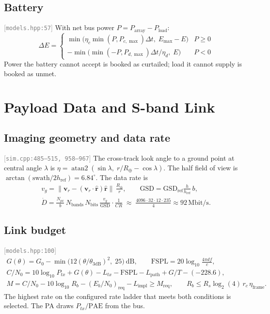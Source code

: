 \documentclass[11pt,a4paper]{article}
\newcommand{\vb}[1]{\boldsymbol{#1}}
\newcommand{\uv}[1]{\hat{\boldsymbol{#1}}}
\newcommand{\src}[1]{\textcolor{gray}{\small[\texttt{#1}]}}
\begin{document}
\subsection{Battery} \src{models.hpp:57}
With net bus power $P = P_{\text{array}} - P_{\text{load}}$:
\begin{equation}
\Delta E = \begin{cases}
\min\!\big(\eta_c\min(P, P_{c,\max})\Delta t,\; E_{\max} - E\big) & P \ge 0\\
-\min\!\big(\min(-P, P_{d,\max})\Delta t/\eta_d,\; E\big) & P < 0
\end{cases}
\end{equation}
Power the battery cannot accept is booked as curtailed; load it cannot supply is booked as unmet.

\section{Payload Data and S-band Link}

\subsection{Imaging geometry and data rate} \src{sim.cpp:485--515, 958--967}
The cross-track look angle to a ground point at central angle $\lambda$ is $\eta = \operatorname{atan2}(\sin\lambda,\; r/R_\oplus - \cos\lambda)$. The half field of view is $\arctan(\text{swath}/2h_{\text{ref}}) = 6.84^\circ$. The data rate is
\begin{gather}
v_g = \big\lVert\vb v_r - (\vb v_r\cdot\uv r)\uv r\big\rVert\,\frac{R_\oplus}{r},\qquad
\text{GSD} = \text{GSD}_{\text{ref}}\frac{h}{h_{\text{ref}}}\,b,\\
\dot D = \frac{N_{px}}{b}\,N_{\text{bands}}\,N_{\text{bits}}\,\frac{v_g}{\text{GSD}}\cdot\frac{1}{CR}\;\approx\;\frac{4096\cdot32\cdot12\cdot235}{4} \approx 92\,\mathrm{Mbit/s}.
\end{gather}

\subsection{Link budget} \src{models.hpp:100}
\begin{gather}
G(\theta) = G_0 - \min\!\big(12(\theta/\theta_{3\text{dB}})^2,\; 25\big)\ \mathrm{dB},\qquad
\text{FSPL} = 20\log_{10}\frac{4\pi d f}{c},\\
C/N_0 = 10\log_{10}P_{tx} + G(\theta) - L_{tx} - \text{FSPL} - L_{\text{path}} + G/T - (-228.6),\\
M = C/N_0 - 10\log_{10}R_b - (E_b/N_0)_{\text{req}} - L_{\text{impl}} \ge M_{\text{req}},\qquad
R_b \le R_s\log_2(4)\,r_c\,\eta_{\text{frame}} .
\end{gather}
The highest rate on the configured rate ladder that meets both conditions is selected. The PA draws $P_{tx}/\text{PAE}$ from the bus.
\end{document}
